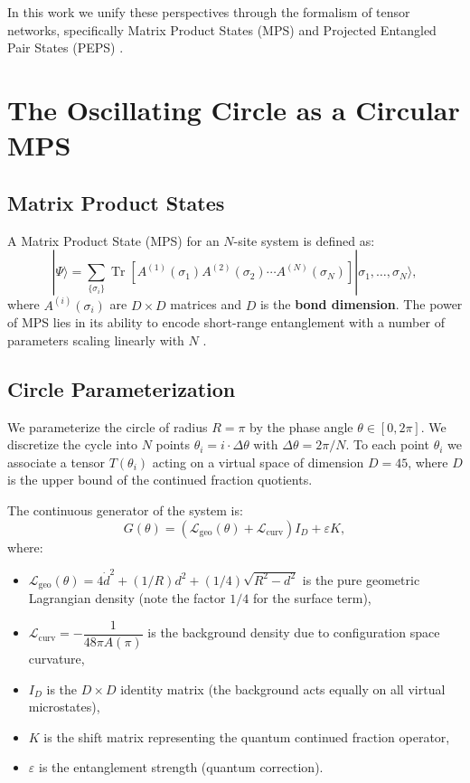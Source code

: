 \documentclass[12pt]{article}
\begin{document}
In this work we unify these perspectives through the formalism of tensor networks,
specifically Matrix Product States (MPS) \cite{verstraete2004,verstraete2006} and
Projected Entangled Pair States (PEPS) \cite{verstraete2004peps,cirac2009,schollwock2011}.

\section{The Oscillating Circle as a Circular MPS}

\subsection{Matrix Product States}

A Matrix Product State (MPS) for an $N$-site system is defined as:
\[
|\Psi\rangle = \sum_{\{\sigma_i\}} \operatorname{Tr}\left[A^{(1)}(\sigma_1) A^{(2)}(\sigma_2)
\cdots A^{(N)}(\sigma_N)\right] |\sigma_1,\dots,\sigma_N\rangle,
\]
where $A^{(i)}(\sigma_i)$ are $D \times D$ matrices and $D$ is the \textbf{bond dimension}.
The power of MPS lies in its ability to encode short-range entanglement with a number
of parameters scaling linearly with $N$ \cite{vidal2003,vidal2004}.

\subsection{Circle Parameterization}

We parameterize the circle of radius $R = \pi$ by the phase angle $\theta \in [0, 2\pi]$.
We discretize the cycle into $N$ points $\theta_i = i \cdot \Delta\theta$ with
$\Delta\theta = 2\pi/N$. To each point $\theta_i$ we associate a tensor $T(\theta_i)$
acting on a virtual space of dimension $D = 45$, where $D$ is the upper bound of the
continued fraction quotients.

The continuous generator of the system is:
\[
G(\theta) = \left( \mathcal{L}_{\text{geo}}(\theta) + \mathcal{L}_{\text{curv}} \right) I_D + \varepsilon K,
\]
where:
\begin{itemize}
    \item $\mathcal{L}_{\text{geo}}(\theta) = 4\dot{d}^2 + (1/R)d^2 + (1/4)\sqrt{R^2-d^2}$
    is the pure geometric Lagrangian density (note the factor $1/4$ for the surface term),
    \item $\mathcal{L}_{\text{curv}} = -\dfrac{1}{48\pi A(\pi)}$ is the background density
    due to configuration space curvature,
    \item $I_D$ is the $D \times D$ identity matrix (the background acts equally on all
    virtual microstates),
    \item $K$ is the shift matrix representing the quantum continued fraction operator,
    \item $\varepsilon$ is the entanglement strength (quantum correction).
\end{itemize}
\end{document}
